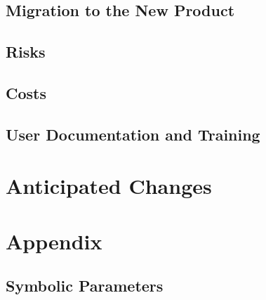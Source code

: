 \documentclass[11pt]{article}
\begin{document}
\subsection{Migration to the New Product}

\subsection{Risks}

\subsection{Costs}

\subsection{User Documentation and Training}

\section{Anticipated Changes}

\section{Appendix}

\subsection{Symbolic Parameters}
\end{document}
